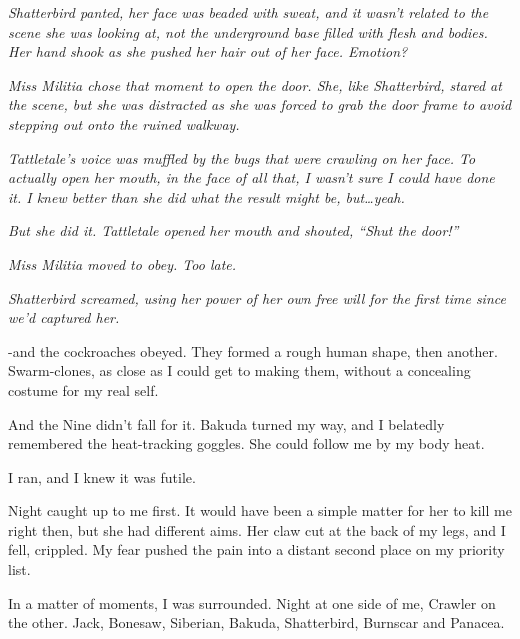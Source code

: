 \emph{Shatterbird panted, her face was beaded with sweat, and it wasn't related to the scene she was looking at, not the underground base filled with flesh and bodies.  Her hand shook as she pushed her hair out of her face.  Emotion?}



\emph{Miss Militia chose that moment to open the door.  She, like Shatterbird, stared at the scene, but she was distracted as she was forced to grab the door frame to avoid stepping out onto the ruined walkway.}



\emph{Tattletale's voice was muffled by the bugs that were crawling on her face.  To actually open her mouth, in the face of all that, I wasn't sure I could have done it.  I knew better than she did what the result might be, but\ldots yeah.}



\emph{But she did it.  Tattletale opened her mouth and shouted, ``Shut the door!''}



\emph{Miss Militia moved to obey.  Too late.}



\emph{Shatterbird screamed, using her power of her own free will for the first time since we'd captured her.}



\sectionbreak



-and the cockroaches obeyed.  They formed a rough human shape, then another.  Swarm-clones, as close as I could get to making them, without a concealing costume for my real self.



And the Nine didn't fall for it.  Bakuda turned my way, and I belatedly remembered the heat-tracking goggles.  She could follow me by my body heat.



I ran, and I knew it was futile.



Night caught up to me first.  It would have been a simple matter for her to kill me right then, but she had different aims.  Her claw cut at the back of my legs, and I fell, crippled.  My fear pushed the pain into a distant second place on my priority list.



In a matter of moments, I was surrounded.  Night at one side of me, Crawler on the other.  Jack, Bonesaw, Siberian, Bakuda, Shatterbird, Burnscar and Panacea.



